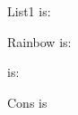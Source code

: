 \documentclass{article}
\begin{document}
List1 is:
\ListI

Rainbow is:
\Rainbow

\mvar{} is:
\BelieveMe

Cons is \Cons{}
\end{document}
